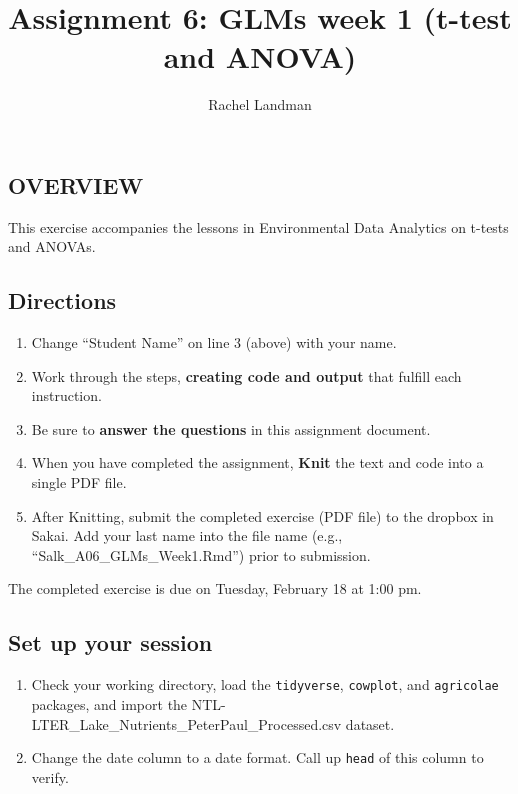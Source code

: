 \documentclass[]{article}
\title{Assignment 6: GLMs week 1 (t-test and ANOVA)}
\author{Rachel Landman}
\date{}
\providecommand{\tightlist}{%
  \setlength{\itemsep}{0pt}\setlength{\parskip}{0pt}}
\begin{document}
\maketitle

\hypertarget{overview}{%
\subsection{OVERVIEW}\label{overview}}

This exercise accompanies the lessons in Environmental Data Analytics on
t-tests and ANOVAs.

\hypertarget{directions}{%
\subsection{Directions}\label{directions}}

\begin{enumerate}
\def\labelenumi{\arabic{enumi}.}
\tightlist
\item
  Change ``Student Name'' on line 3 (above) with your name.
\item
  Work through the steps, \textbf{creating code and output} that fulfill
  each instruction.
\item
  Be sure to \textbf{answer the questions} in this assignment document.
\item
  When you have completed the assignment, \textbf{Knit} the text and
  code into a single PDF file.
\item
  After Knitting, submit the completed exercise (PDF file) to the
  dropbox in Sakai. Add your last name into the file name (e.g.,
  ``Salk\_A06\_GLMs\_Week1.Rmd'') prior to submission.
\end{enumerate}

The completed exercise is due on Tuesday, February 18 at 1:00 pm.

\hypertarget{set-up-your-session}{%
\subsection{Set up your session}\label{set-up-your-session}}

\begin{enumerate}
\def\labelenumi{\arabic{enumi}.}
\item
  Check your working directory, load the \texttt{tidyverse},
  \texttt{cowplot}, and \texttt{agricolae} packages, and import the
  NTL-LTER\_Lake\_Nutrients\_PeterPaul\_Processed.csv dataset.
\item
  Change the date column to a date format. Call up \texttt{head} of this
  column to verify.
\end{enumerate}
\end{document}

